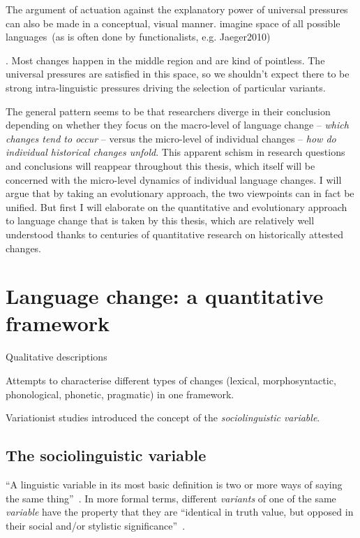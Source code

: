 The argument of actuation against the explanatory power of universal pressures can also be made in a conceptual, visual manner. 
imagine space of all possible languages~(as is often done by functionalists, e.g. Jaeger2010)

. Most changes happen in the middle region and are kind of pointless. The universal pressures are satisfied in this space, so we shouldn't expect there to be strong intra-linguistic pressures driving the selection of particular variants.


The general pattern seems to be that researchers diverge in their conclusion depending on whether they focus on the macro-level of language change -- \emph{which changes tend to occur} -- versus the micro-level of individual changes -- \emph{how do individual historical changes unfold}. This apparent schism in research questions and conclusions will reappear throughout this thesis, which itself will be concerned with the micro-level dynamics of individual language changes.
I will argue that by taking an evolutionary approach, the two viewpoints can in fact be unified.
But first I will elaborate on the quantitative and evolutionary approach to language change that is taken by this thesis, which are relatively well understood thanks to centuries of quantitative research on historically attested changes.

\section{Language change: a quantitative framework}

Qualitative descriptions

Attempts to characterise different types of changes (lexical, morphosyntactic, phonological, phonetic, pragmatic) in one framework.

Variationist studies introduced the concept of the \emph{sociolinguistic variable}.

\subsection{The sociolinguistic variable}
\label{sec:sociolinguisticvariable}



``A linguistic variable in its most basic definition is two or more ways of saying the same thing''~\citep[p.4]{Tagliamonte2012}.
In more formal terms, different \emph{variants} of one of the same \emph{variable} have the property that they are ``identical in truth value, but opposed in their social and/or stylistic significance''~\citep[p.271]{Labov1972}. %


